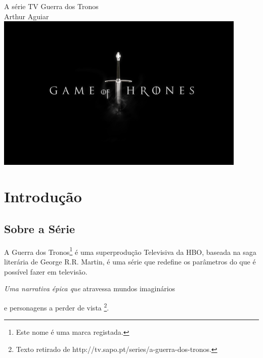 \documentclass[a4paper,11pt]{report}
\begin{document}

	\begin{titlepage}
		\centering
		{\Large A série TV Guerra dos Tronos} \\ [1cm]
		{\large Arthur Aguiar} \\ [1cm]
		\includegraphics[width=12cm]{./game-of-thrones.jpg}
	\end{titlepage}


	\chapter{Introdução}
	\section{Sobre a Série}
	\label{intro}

		A {\Huge Guerra dos Tronos}\footnote{Este nome é uma marca registada.} 
		é uma superprodução Televisiva da HBO,
		baseada na saga literária de George R.R. Martin, é uma série
		que {\tiny redefine os parâmetros do que é possível fazer em televisão.}

		\vspace{1cm} %

		\textit{Uma narrativa épica que} {\huge atravessa mundos imaginários}

		\vspace{-0.5cm} %

		\begin{center}
			e personagens a perder de vista
			\footnote{Texto retirado de http://tv.sapo.pt/series/a-guerra-dos-tronos.}.
		\end{center}

		\vspace{1cm} %
\end{document}
